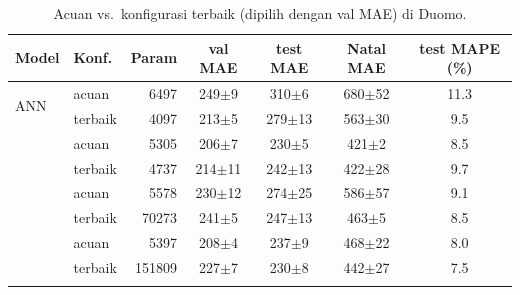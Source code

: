 \begin{table}[t]
\centering
\scriptsize
\caption{Acuan vs.\ konfigurasi terbaik (dipilih dengan val MAE) di Duomo.}
\label{tab:C}
\setlength{\tabcolsep}{2.5pt}
\begin{tabular}{@{}llrcccc@{}}
\toprule
Model & Konf. & Param & val MAE & test MAE & Natal MAE & test MAPE (\%) \\
\midrule
\multirow{2}{*}{ANN} & acuan & 6497 & 249$\pm$9 & 310$\pm$6 & 680$\pm$52 & 11.3 \\
 & terbaik & 4097 & 213$\pm$5 & 279$\pm$13 & 563$\pm$30 & 9.5 \\
\addlinespace[1pt]
\multirow{2}{*}{RNN} & acuan & 5305 & 206$\pm$7 & 230$\pm$5 & 421$\pm$2 & 8.5 \\
 & terbaik & 4737 & 214$\pm$11 & 242$\pm$13 & 422$\pm$28 & 9.7 \\
\addlinespace[1pt]
\multirow{2}{*}{LSTM} & acuan & 5578 & 230$\pm$12 & 274$\pm$25 & 586$\pm$57 & 9.1 \\
 & terbaik & 70273 & 241$\pm$5 & 247$\pm$13 & 463$\pm$5 & 8.5 \\
\addlinespace[1pt]
\multirow{2}{*}{GRU} & acuan & 5397 & 208$\pm$4 & 237$\pm$9 & 468$\pm$22 & 8.0 \\
 & terbaik & 151809 & 227$\pm$7 & 230$\pm$8 & 442$\pm$27 & 7.5 \\
\addlinespace[1pt]
\bottomrule
\end{tabular}
\end{table}